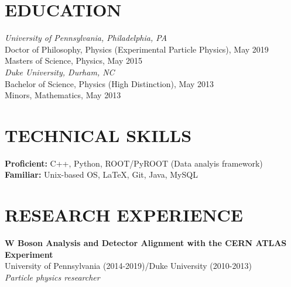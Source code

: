 \documentclass[11pt]{res}
\begin{document}
\begin{resume}

 
\section{EDUCATION}          
    {\it University of Pennsylvania, Philadelphia, PA} \\
    Doctor of Philosophy, Physics (Experimental Particle Physics), May 2019 \\
    Masters of Science, Physics, May 2015 \\
    \newline
    {\it Duke University, Durham, NC} \\        
    Bachelor of Science, Physics (High Distinction), May 2013   \\       
    Minors, Mathematics, May 2013 
 
\section{TECHNICAL SKILLS}
    {\bf Proficient:} C++, Python, ROOT/PyROOT (Data analyis framework)\\
    {\bf Familiar:} Unix-based OS, \LaTeX, Git, Java, MySQL %

\section{RESEARCH EXPERIENCE}%
    {\bf $\boldsymbol{W}$ Boson Analysis and Detector Alignment with the CERN ATLAS Experiment}\\
    University of Pennsylvania (2014-2019)/Duke University (2010-2013)\\
    {\it Particle physics researcher}


\end{resume}
\end{document}
